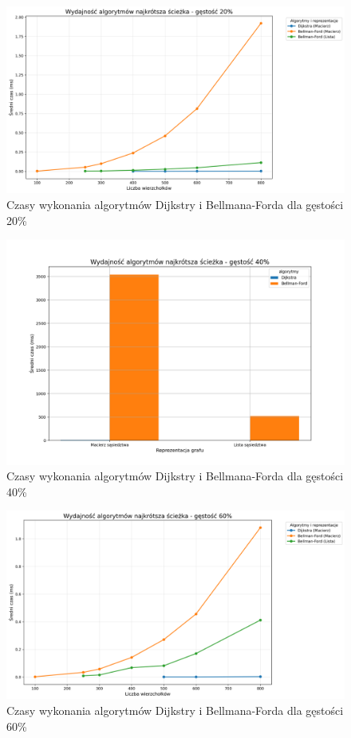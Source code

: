 \documentclass{article}
\begin{document}
\begin{figure}[H]
    \centering
    \includegraphics[scale=0.5]{../Python/charts_type2/Typ2_SHORTEST_PATH_gestosc20_wykres.png}
    \caption{Czasy wykonania algorytmów Dijkstry i Bellmana-Forda dla gęstości 20\%}
\end{figure}
\begin{figure}[H]
    \centering
    \includegraphics[scale=0.5]{../Python/charts_type2/Typ2_SHORTEST_PATH_gestosc40_wykres.png}
    \caption{Czasy wykonania algorytmów Dijkstry i Bellmana-Forda dla gęstości 40\%}
\end{figure}

\begin{figure}[H]
    \centering
    \includegraphics[scale=0.5]{../Python/charts_type2/Typ2_SHORTEST_PATH_gestosc60_wykres.png}
    \caption{Czasy wykonania algorytmów Dijkstry i Bellmana-Forda dla gęstości 60\%}
\end{figure}
\end{document}
